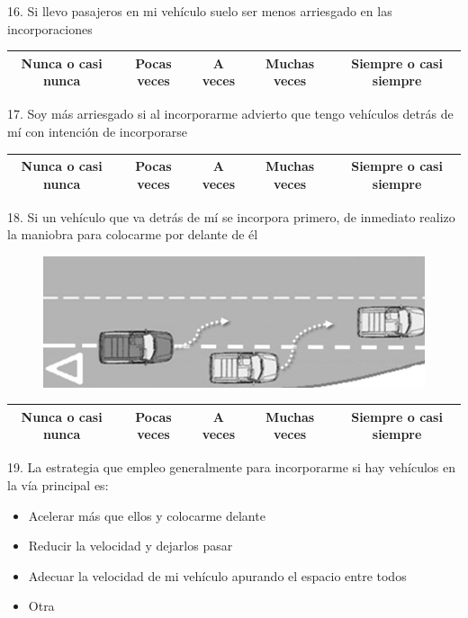 16. Si llevo pasajeros en mi vehículo suelo ser menos arriesgado en las incorporaciones
\vspace{-10pt}
\begin{table}[H]
\centering
\begin{tabular}{|c|c|c|c|c|}
\hline
Nunca o casi nunca & Pocas veces & A veces & Muchas veces & Siempre o casi siempre \\ \hline
\end{tabular}
\end{table}

17. Soy más arriesgado si al incorporarme advierto que tengo vehículos detrás de mí con intención de incorporarse
\vspace{-10pt}
\begin{table}[h]
\centering
\begin{tabular}{|c|c|c|c|c|}
\hline
Nunca o casi nunca & Pocas veces & A veces & Muchas veces & Siempre o casi siempre \\ \hline
\end{tabular}
\end{table}

18. Si un vehículo que va detrás de mí se incorpora primero, de inmediato realizo la maniobra para colocarme por delante de él 
\begin{figure}[h]
    \centering
    \includegraphics[width=14cm]
    {figures/A4.png}
\end{figure}
   
\vspace{-10pt}
\begin{table}[h]
\centering
\begin{tabular}{|c|c|c|c|c|}
\hline
Nunca o casi nunca & Pocas veces & A veces & Muchas veces & Siempre o casi siempre \\ \hline
\end{tabular}
\end{table}

19. La estrategia que empleo generalmente para incorporarme si hay vehículos en la vía principal es: 
   \begin{itemize}
        \item Acelerar más que ellos y colocarme delante
        \item Reducir la velocidad y dejarlos pasar
        \item Adecuar la velocidad de mi vehículo apurando el espacio entre todos
        \item Otra
   \end{itemize}
\vspace{10pt}

